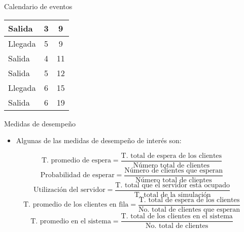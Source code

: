 \begin{frame}{Calendario de eventos}
\begin{table}[]
\begin{tabular}{|l|c|c|}
\rowcolor[HTML]{F28165} 
{\color[HTML]{FFFFFF} Salida} & {\color[HTML]{FFFFFF} 3} & {\color[HTML]{FFFFFF} 9} \\ \hline
\rowcolor[HTML]{F28165} 
{\color[HTML]{FFFFFF} Llegada} & {\color[HTML]{FFFFFF} 5} & {\color[HTML]{FFFFFF} 9} \\ \hline
\rowcolor[HTML]{F28165} 
{\color[HTML]{FFFFFF} Salida} & {\color[HTML]{FFFFFF} 4} & {\color[HTML]{FFFFFF} 11} \\ \hline
\rowcolor[HTML]{F28165} 
{\color[HTML]{FFFFFF} Salida} & {\color[HTML]{FFFFFF} 5} & {\color[HTML]{FFFFFF} 12} \\ \hline
\rowcolor[HTML]{F28165} 
{\color[HTML]{FFFFFF} Llegada} & {\color[HTML]{FFFFFF} 6} & {\color[HTML]{FFFFFF} 15} \\ \hline
\rowcolor[HTML]{F28165} 
{\color[HTML]{FFFFFF} Salida} & {\color[HTML]{FFFFFF} 6} & {\color[HTML]{FFFFFF} 19} \\ \hline
\end{tabular}
\end{table}
\end{frame}

\begin{frame}{Medidas de desempeño}
\begin{itemize}
    \item Algunas de las medidas de desempeño de interés son:
\end{itemize}
\[\text{T. promedio de espera}=\frac{\text{T. total de espera de los clientes}}{\text{Número total de clientes}}\]
\[\text{Probabilidad de esperar}=\frac{\text{Número de clientes que esperan}}{\text{Número total de clientes}}\]
\[\text{Utilización del servidor}=\frac{\text{T. total que el servidor está ocupado}}{\text{T. total de la simulación}}\]
\[\text{T. promedio de los clientes en fila}=\frac{\text{T. total de espera de los clientes}}{\text{No. total de clientes que esperan}}\]
\[\text{T. promedio en el sistema}=\frac{\text{T. total de los clientes en el sistema}}{\text{No. total de clientes}}\]
\end{frame}
